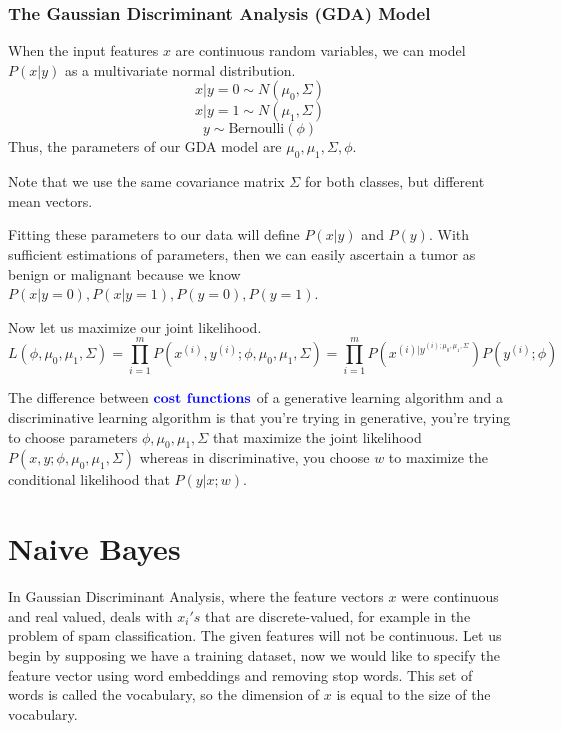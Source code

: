 \documentclass[12pt]{scrartcl}
\begin{document}
\subsubsection{The Gaussian Discriminant Analysis (GDA) Model}

When the input features $x$ are continuous random variables, we can model $P(x
    | y)$ as a multivariate normal distribution.
\[x | y = 0 \sim N(\mu_0, \Sigma)\]
\[x | y = 1 \sim N(\mu_1, \Sigma)\]
\[y \sim \text{Bernoulli}(\phi)\]
Thus, the parameters of our GDA model are $\mu_0, \mu_1, \Sigma, \phi$.

\begin{note}
    Note that we use the same covariance matrix $\Sigma$ for both classes, but different mean vectors.
\end{note}

Fitting these parameters to our data will define $P(x | y)$ and $P(y)$. With
sufficient estimations of parameters, then we can easily ascertain a tumor as
benign or malignant because we know $P(x | y = 0), P(x | y = 1), P(y = 0), P(y
    = 1)$.

Now let us maximize our joint likelihood.
\[L(\phi, \mu_0, \mu_1, \Sigma) = \prod_{i=1}^m P(x^{(i)}, y^{(i)}; \phi, \mu_0, \mu_1, \Sigma) = \prod_{i=1}^mP(x^{(i) | y^{(i); \mu_0, \mu_1, \Sigma}})P(y^{(i)}; \phi)\]

\begin{note}
    The difference between $\textbf{\color{blue} cost functions}$ of a generative learning algorithm and a discriminative learning algorithm is that you're trying in generative, you're trying to choose parameters $\phi, \mu_0, \mu_1, \Sigma$ that maximize the joint likelihood $P(x, y; \phi, \mu_0, \mu_1, \Sigma)$ whereas in discriminative, you choose $w$ to maximize the conditional likelihood that $P(y | x; w)$.
\end{note}

\section{Naive Bayes}

In Gaussian Discriminant Analysis, where the feature vectors $x$ were
continuous and real valued,  deals with $x_i's$ that are
discrete-valued, for example in the problem of spam classification. The given
features will not be continuous. Let us begin by supposing we have a training
dataset, now we would like to specify the feature vector using word embeddings
and removing stop words. This set of words is called the vocabulary, so the
dimension of $x$ is equal to the size of the vocabulary.
\end{document}

